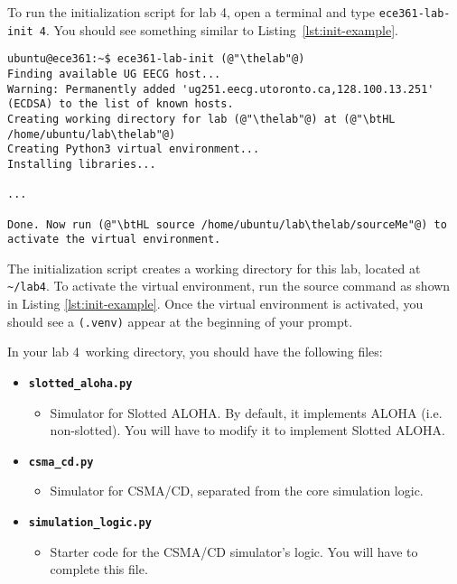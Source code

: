 \documentclass[11pt]{article}
\def\thelab{4}
\begin{document}

To run the initialization script for lab \thelab, open a terminal and type \texttt{ece361-lab-init \thelab}.
You should see something similar to Listing~\ref{lst:init-example}.

\begin{lstlisting}[style=ece361shell, caption={Initializing lab \thelab.}, label={lst:init-example}]
ubuntu@ece361:~$ ece361-lab-init (@"\thelab"@)
Finding available UG EECG host...
Warning: Permanently added 'ug251.eecg.utoronto.ca,128.100.13.251' (ECDSA) to the list of known hosts.
Creating working directory for lab (@"\thelab"@) at (@"\btHL /home/ubuntu/lab\thelab"@)
Creating Python3 virtual environment...
Installing libraries...

...

Done. Now run (@"\btHL source /home/ubuntu/lab\thelab/sourceMe"@) to activate the virtual environment.
\end{lstlisting}

The initialization script creates a working directory for this lab, located at \texttt{\textasciitilde/lab\thelab}.
To activate the virtual environment, run the source command as shown in Listing \ref{lst:init-example}.
Once the virtual environment is activated, you should see a \texttt{(.venv)} appear at the beginning of your prompt.



In your lab \thelab~working directory, you should have the following files:
\begin{itemize}
	\item \texttt{\textbf{slotted\_aloha.py}}
        \begin{itemize}
            \item Simulator for Slotted ALOHA. By default, it implements ALOHA (i.e. non-slotted). You will have to modify it to implement Slotted ALOHA.
        \end{itemize}

	\item \texttt{\textbf{csma\_cd.py}}
        \begin{itemize}
            \item Simulator for CSMA/CD, separated from the core simulation logic.
        \end{itemize}

	\item \texttt{\textbf{simulation\_logic.py}}
        \begin{itemize}
            \item Starter code for the CSMA/CD simulator's logic. You will have to complete this file.
        \end{itemize}
\end{itemize}
\end{document}
